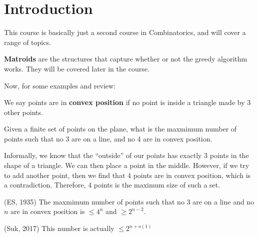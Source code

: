 
\section{Introduction}

This course is basically just a second course in Combinatorics, and will cover a range of topics.

\begin{definition}
	\textbf{Matroids} are the structures that capture whether or not the greedy algorithm works. They will be covered later in the course.
\end{definition}

Now, for some examples and review:

\begin{definition}
	We say points are in \textbf{convex position} if no point is inside a triangle made by 3 other points.
\end{definition}

\begin{eg}
	Given a finite set of points on the plane, what is the maxmimum number of points such that no 3 are on a line, and no 4 are in convex position.
\end{eg}

\begin{explanation}
	Informally, we know that the ``outside'' of our points has exactly 3 points in the shape of a triangle. We can then place a point in the middle. However, if we try to add another point, then we find that 4 points are in convex position, which is a contradiction. Therefore, 4 points is the maximum size of such a set.
\end{explanation}

\begin{theorem}
	(ES, 1935) The maxmimum number of points such that no 3 are on a line and no \( n \) are in convex position is \( \le 4^n \) and \( \ge 2^{n-2}  \).
\end{theorem}

\begin{theorem}
	(Suk, 2017) This number is actually \( \le 2^{n + o(1)}  \)
\end{theorem}
